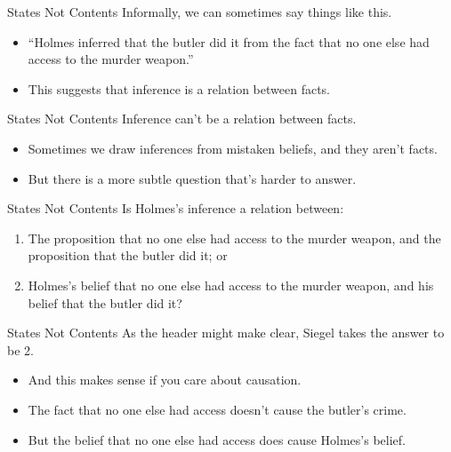 \documentclass[
  17pt,
  letterpaper,
  ignorenonframetext,
  aspectratio=169,
  handout,
  xcolor={dvipsnames}]{beamer}
\providecommand{\tightlist}{%
  \setlength{\itemsep}{0pt}\setlength{\parskip}{0pt}}\usepackage{longtable,booktabs,array}
\begin{document}
\begin{frame}{States Not Contents}
\protect\hypertarget{states-not-contents}{}
Informally, we can sometimes say things like this.

\begin{itemize}[<+->]
\tightlist
\item
  ``Holmes inferred that the butler did it from the fact that no one
  else had access to the murder weapon.''
\item
  This suggests that inference is a relation between facts.
\end{itemize}
\end{frame}

\begin{frame}{States Not Contents}
\protect\hypertarget{states-not-contents-1}{}
Inference can't be a relation between facts.

\begin{itemize}[<+->]
\tightlist
\item
  Sometimes we draw inferences from mistaken beliefs, and they aren't
  facts.
\item
  But there is a more subtle question that's harder to answer.
\end{itemize}
\end{frame}

\begin{frame}{States Not Contents}
\protect\hypertarget{states-not-contents-2}{}
Is Holmes's inference a relation between:

\begin{enumerate}[<+->]
\tightlist
\item
  The proposition that no one else had access to the murder weapon, and
  the proposition that the butler did it; or
\item
  Holmes's belief that no one else had access to the murder weapon, and
  his belief that the butler did it?
\end{enumerate}
\end{frame}

\begin{frame}{States Not Contents}
\protect\hypertarget{states-not-contents-3}{}
As the header might make clear, Siegel takes the answer to be 2.

\begin{itemize}[<+->]
\tightlist
\item
  And this makes sense if you care about causation.
\item
  The fact that no one else had access doesn't cause the butler's crime.
\item
  But the belief that no one else had access does cause Holmes's belief.
\end{itemize}
\end{frame}
\end{document}
